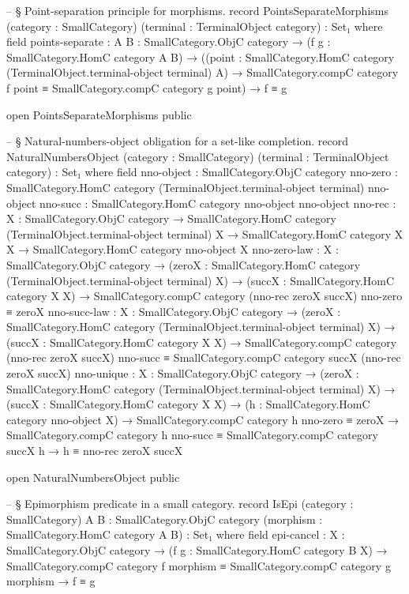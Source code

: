 \documentclass[11pt]{article}
\begin{document}
\begin{code}
-- § Point-separation principle for morphisms.
record PointsSeparateMorphisms
  (category : SmallCategory)
  (terminal : TerminalObject category) : Set₁ where
  field
    points-separate :
      {A B : SmallCategory.ObjC category} →
      (f g : SmallCategory.HomC category A B) →
      ((point : SmallCategory.HomC category
                  (TerminalObject.terminal-object terminal) A) →
        SmallCategory.compC category f point ≡
        SmallCategory.compC category g point) →
      f ≡ g

open PointsSeparateMorphisms public

-- § Natural-numbers-object obligation for a set-like completion.
record NaturalNumbersObject
  (category : SmallCategory)
  (terminal : TerminalObject category) : Set₁ where
  field
    nno-object : SmallCategory.ObjC category
    nno-zero   : SmallCategory.HomC category
                   (TerminalObject.terminal-object terminal)
                   nno-object
    nno-succ   : SmallCategory.HomC category nno-object nno-object
    nno-rec    : {X : SmallCategory.ObjC category} →
                 SmallCategory.HomC category
                   (TerminalObject.terminal-object terminal) X →
                 SmallCategory.HomC category X X →
                 SmallCategory.HomC category nno-object X
    nno-zero-law :
      {X : SmallCategory.ObjC category} →
      (zeroX : SmallCategory.HomC category
                 (TerminalObject.terminal-object terminal) X) →
      (succX : SmallCategory.HomC category X X) →
      SmallCategory.compC category (nno-rec zeroX succX) nno-zero ≡ zeroX
    nno-succ-law :
      {X : SmallCategory.ObjC category} →
      (zeroX : SmallCategory.HomC category
                 (TerminalObject.terminal-object terminal) X) →
      (succX : SmallCategory.HomC category X X) →
      SmallCategory.compC category (nno-rec zeroX succX) nno-succ ≡
      SmallCategory.compC category succX (nno-rec zeroX succX)
    nno-unique :
      {X : SmallCategory.ObjC category} →
      (zeroX : SmallCategory.HomC category
                 (TerminalObject.terminal-object terminal) X) →
      (succX : SmallCategory.HomC category X X) →
      (h : SmallCategory.HomC category nno-object X) →
      SmallCategory.compC category h nno-zero ≡ zeroX →
      SmallCategory.compC category h nno-succ ≡
        SmallCategory.compC category succX h →
      h ≡ nno-rec zeroX succX

open NaturalNumbersObject public

-- § Epimorphism predicate in a small category.
record IsEpi
  (category : SmallCategory)
  {A B : SmallCategory.ObjC category}
  (morphism : SmallCategory.HomC category A B) : Set₁ where
  field
    epi-cancel :
      {X : SmallCategory.ObjC category} →
      (f g : SmallCategory.HomC category B X) →
      SmallCategory.compC category f morphism ≡
      SmallCategory.compC category g morphism →
      f ≡ g


\end{code}
\end{document}
